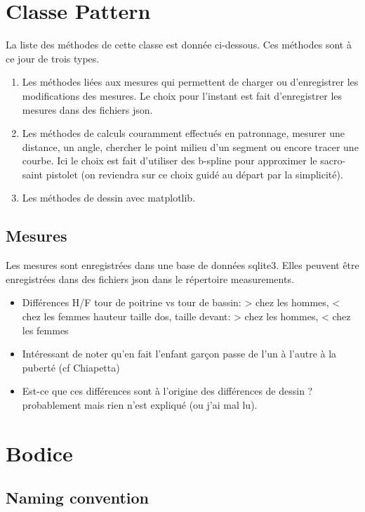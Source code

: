 \documentclass[11pt,a4paper]{report}
\begin{document}
\section{Classe Pattern}
La liste des méthodes de cette classe est donnée ci-dessous. Ces méthodes sont à ce jour de trois types.

\begin{enumerate}
\item Les méthodes liées aux mesures qui permettent de charger ou d'enregistrer les modifications des mesures. Le choix pour l'instant est fait d'enregistrer les mesures dans des fichiers json.
\item Les méthodes de calculs couramment effectués en patronnage, mesurer une distance, un angle, chercher le point milieu d'un segment ou encore tracer une courbe. Ici le choix est fait d'utiliser des b-spline pour approximer le sacro-saint pistolet (on reviendra sur ce choix guidé au départ par la simplicité).
\item Les méthodes de dessin avec matplotlib.
\end{enumerate}

\subsection{Mesures}
Les mesures sont enregistrées dans une base de données sqlite3. Elles peuvent être enregistrées dans des fichiers json dans le répertoire measurements.

\begin{itemize}

\item Différences H/F
\subitem tour de poitrine vs tour de bassin: > chez les hommes, < chez les femmes
\subitem hauteur taille dos, taille devant: > chez les hommes, < chez les femmes

\item Intéressant de noter qu'en fait l'enfant garçon passe de l'un à l'autre à la puberté (cf Chiapetta)

\item Est-ce que ces différences sont à l'origine des différences de dessin ? probablement mais rien n'est expliqué (ou j'ai mal lu).
\end{itemize}


\section{Bodice}

\subsection{Naming convention}
\end{document}
